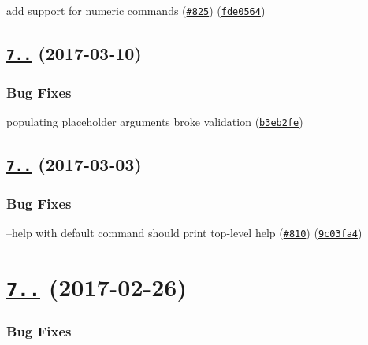 \begin{DoxyItemize}
\item add support for numeric commands (\href{https://github.com/yargs/yargs/issues/825}{\tt \#825}) (\href{https://github.com/yargs/yargs/commit/fde0564}{\tt fde0564})
\end{DoxyItemize}

\label{_7.0.2}%
 \subsection*{\href{https://github.com/yargs/yargs/compare/v7.0.1...v7.0.2}{\tt 7..} (2017-\/03-\/10)}

\subsubsection*{Bug Fixes}


\begin{DoxyItemize}
\item populating placeholder arguments broke validation (\href{https://github.com/yargs/yargs/commit/b3eb2fe}{\tt b3eb2fe})
\end{DoxyItemize}

\label{_7.0.1}%
 \subsection*{\href{https://github.com/yargs/yargs/compare/v7.0.0...v7.0.1}{\tt 7..} (2017-\/03-\/03)}

\subsubsection*{Bug Fixes}


\begin{DoxyItemize}
\item --help with default command should print top-\/level help (\href{https://github.com/yargs/yargs/issues/810}{\tt \#810}) (\href{https://github.com/yargs/yargs/commit/9c03fa4}{\tt 9c03fa4})
\end{DoxyItemize}

\label{_7.0.0}%
 \section*{\href{https://github.com/yargs/yargs/compare/v6.6.0...v7.0.0}{\tt 7..} (2017-\/02-\/26)}

\subsubsection*{Bug Fixes}


